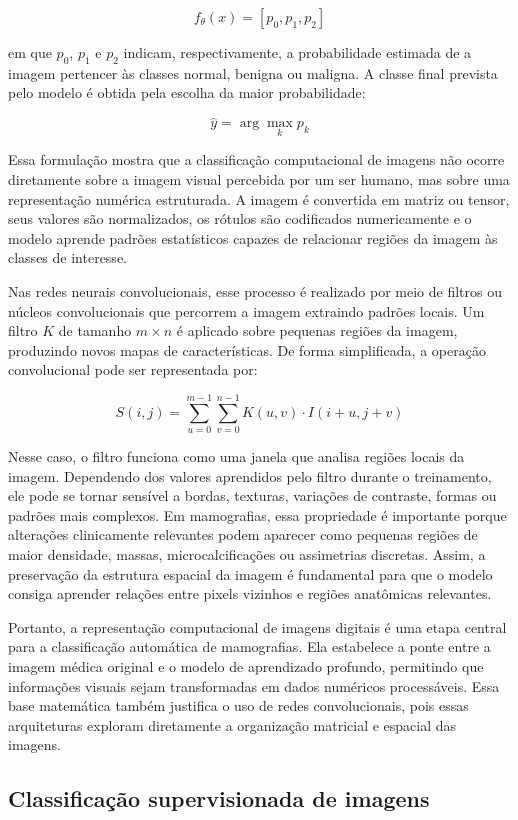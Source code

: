 \documentclass[
    12pt,
    openright,
    oneside,
    a4paper,
    english,
    brazil
]{abntex2}
\begin{document}
\[
f_{\theta}(x) = [p_0, p_1, p_2]
\]

em que \(p_0\), \(p_1\) e \(p_2\) indicam, respectivamente, a probabilidade estimada de a imagem pertencer às classes normal, benigna ou maligna. A classe final prevista pelo modelo é obtida pela escolha da maior probabilidade:

\[
\hat{y} = \arg\max_{k} p_k
\]

Essa formulação mostra que a classificação computacional de imagens não ocorre diretamente sobre a imagem visual percebida por um ser humano, mas sobre uma representação numérica estruturada. A imagem é convertida em matriz ou tensor, seus valores são normalizados, os rótulos são codificados numericamente e o modelo aprende padrões estatísticos capazes de relacionar regiões da imagem às classes de interesse.

Nas redes neurais convolucionais, esse processo é realizado por meio de filtros ou núcleos convolucionais que percorrem a imagem extraindo padrões locais. Um filtro \(K\) de tamanho \(m \times n\) é aplicado sobre pequenas regiões da imagem, produzindo novos mapas de características. De forma simplificada, a operação convolucional pode ser representada por:

\[
S(i,j) = \sum_{u=0}^{m-1}\sum_{v=0}^{n-1} K(u,v) \cdot I(i+u,j+v)
\]

Nesse caso, o filtro funciona como uma janela que analisa regiões locais da imagem. Dependendo dos valores aprendidos pelo filtro durante o treinamento, ele pode se tornar sensível a bordas, texturas, variações de contraste, formas ou padrões mais complexos. Em mamografias, essa propriedade é importante porque alterações clinicamente relevantes podem aparecer como pequenas regiões de maior densidade, massas, microcalcificações ou assimetrias discretas. Assim, a preservação da estrutura espacial da imagem é fundamental para que o modelo consiga aprender relações entre pixels vizinhos e regiões anatômicas relevantes.

Portanto, a representação computacional de imagens digitais é uma etapa central para a classificação automática de mamografias. Ela estabelece a ponte entre a imagem médica original e o modelo de aprendizado profundo, permitindo que informações visuais sejam transformadas em dados numéricos processáveis. Essa base matemática também justifica o uso de redes convolucionais, pois essas arquiteturas exploram diretamente a organização matricial e espacial das imagens.

\subsection{Classificação supervisionada de imagens}
\label{subsec:classificacao_supervisionada_imagens}
\end{document}
